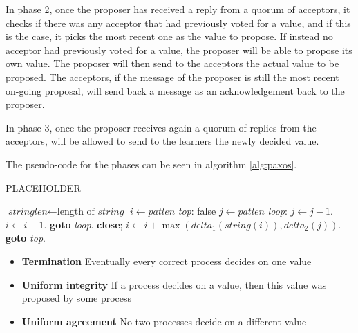 In phase 2, once the proposer has received a reply from a quorum of acceptors, it checks if there was any acceptor that had previously voted for a value, and if this is the case, it picks the most recent one as the value to propose. If instead no acceptor had previously voted for a value, the proposer will be able to propose its own value. The proposer will then send to the acceptors the actual value to be proposed.
The acceptors, if the message of the proposer is still the most recent on-going proposal, will send back a message as an acknowledgement back to the proposer.

In phase 3, once the proposer receives again a quorum of replies from the acceptors, will be allowed to send to the learners the newly decided value.

The pseudo-code for the phases can be seen in algorithm \ref{alg:paxos}.
\begin{algorithm}
  \caption{PLACEHOLDER}\label{alg:paxos}
  \begin{algorithmic}[1]
  \State $\textit{stringlen} \gets \text{length of }\textit{string}$
  \State $i \gets \textit{patlen}$
  \State \emph{top}:
   \Return false
  \EndIf
  \State $j \gets \textit{patlen}$
  \State \emph{loop}:
  \State $j \gets j-1$.
  \State $i \gets i-1$.
  \State \textbf{goto} \emph{loop}.
  \State \textbf{close};
  \EndIf
  \State $i \gets i+\max(\textit{delta}_1(\textit{string}(i)),\textit{delta}_2(j))$.
  \State \textbf{goto} \emph{top}.
  \EndProcedure
  \end{algorithmic}
  \end{algorithm}

\begin{itemize}
  \item \textbf{Termination} Eventually every correct process decides on one value
  \item \textbf{Uniform integrity} If a process decides on a value, then this value was proposed by some process
  \item \textbf{Uniform agreement} No two processes decide on a different value
  \end{itemize}

